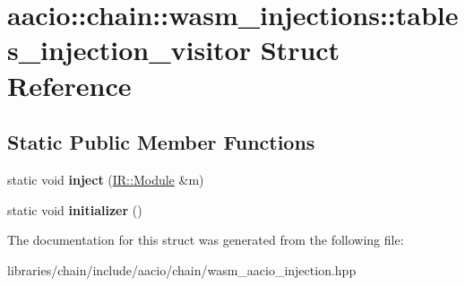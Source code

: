 \hypertarget{structaacio_1_1chain_1_1wasm__injections_1_1tables__injection__visitor}{}\section{aacio\+:\+:chain\+:\+:wasm\+\_\+injections\+:\+:tables\+\_\+injection\+\_\+visitor Struct Reference}
\label{structaacio_1_1chain_1_1wasm__injections_1_1tables__injection__visitor}
\subsection*{Static Public Member Functions}
\begin{DoxyCompactItemize}
\item 
\mbox{\label{structaacio_1_1chain_1_1wasm__injections_1_1tables__injection__visitor_abc5dcfed46644400aa67e34cb7635736}} 
static void {\bfseries inject} (\mbox{\hyperlink{struct_i_r_1_1_module}{I\+R\+::\+Module}} \&m)
\item 
\mbox{\label{structaacio_1_1chain_1_1wasm__injections_1_1tables__injection__visitor_a48c70a2edbe02fd1759859303cb28a4d}} 
static void {\bfseries initializer} ()
\end{DoxyCompactItemize}


The documentation for this struct was generated from the following file\+:\begin{DoxyCompactItemize}
\item 
libraries/chain/include/aacio/chain/wasm\+\_\+aacio\+\_\+injection.\+hpp\end{DoxyCompactItemize}
